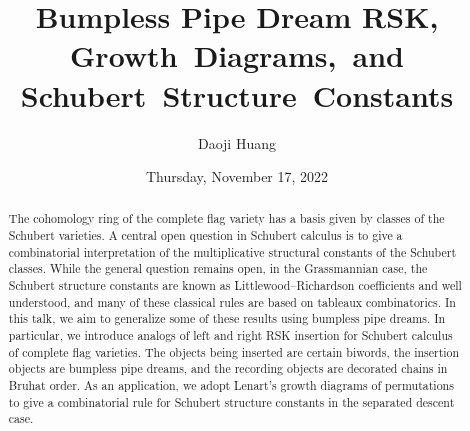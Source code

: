 \documentclass{UAmathtalk}
\author{Daoji Huang}
\title{Bumpless Pipe Dream RSK, Growth~Diagrams,~and Schubert~Structure~Constants}
\date{Thursday, November 17, 2022}
\begin{document}
\maketitle

\begin{abstract}
The cohomology ring of the complete flag variety has a basis given by classes of the Schubert varieties. A central open question in Schubert calculus is to give a combinatorial interpretation of the multiplicative structural constants of the Schubert classes. While the general question remains open, in the Grassmannian case, the Schubert structure constants are known as Littlewood–Richardson coefficients and well understood, and many of these classical rules are based on tableaux combinatorics. In this talk, we aim to generalize some of these results using bumpless pipe dreams. In particular, we introduce analogs of left and right RSK insertion for Schubert calculus of complete flag varieties. The objects being inserted are certain biwords, the insertion objects are bumpless pipe dreams, and the recording objects are decorated chains in Bruhat order. As an application, we adopt Lenart’s growth diagrams of permutations to give a combinatorial rule for Schubert structure constants in the separated descent case.
\end{abstract}
\end{document}
